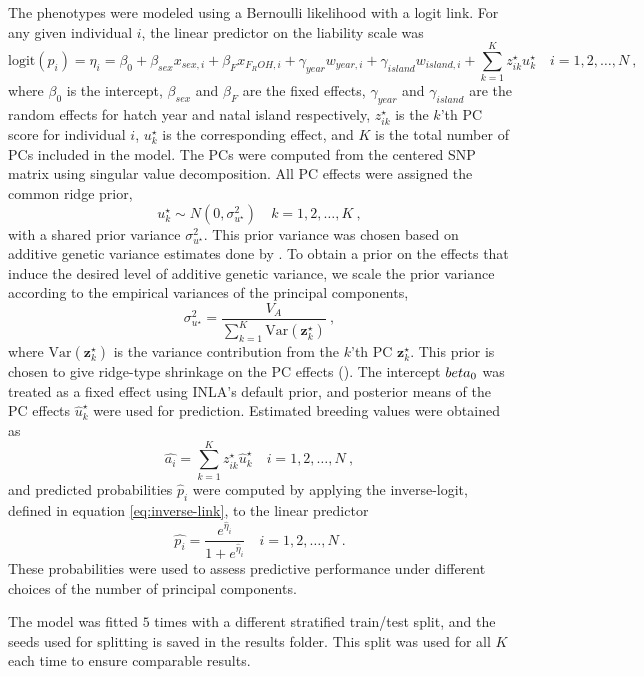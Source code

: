 The phenotypes were modeled using a Bernoulli likelihood with a logit link. For any given individual $i$, the linear predictor on the liability scale was
$$
\mathrm{logit}(p_i) = \eta_i =   \beta_0 + \beta_{sex}x_{sex, i} + \beta_{F} x_{F_ROH, i} + \gamma_{year} w_{year, i} + \gamma_{island} w_{island, i} + \sum_{k=1}^K z_{ik}^\star u_k^\star \quad i = 1, 2, \dots, N \ ,
$$
where $\beta_0$ is the intercept, $\beta_{sex}$ and $\beta_F$ are the fixed effects, $\gamma_{year}$ and $\gamma_{island}$ are the random effects for hatch year and natal island respectively, $z_{ik}^\star$ is the $k$'th PC score for individual $i$, $u_k^\star$ is the corresponding effect, and $K$ is the total number of PCs included in the model. The PCs were computed from the centered SNP matrix using singular value decomposition. All PC effects were assigned the common ridge prior,
$$
u_k^\star \sim N(0, \sigma_{u^\star}^2) \quad k = 1, 2, \dots, K\ ,
$$
with a shared prior variance $\sigma_{u^\star}^2$. This prior variance was chosen based on additive genetic variance estimates done by \textcite{saatoglu_genetic_2024}. 
To obtain a prior on the effects that induce the desired level of additive genetic variance, we scale the prior variance according to the empirical variances of the principal components,
$$
\sigma_{u^\star}^2 = 
\frac{V_A}{\sum_{k=1}^K \mathrm{Var}(\mathbf{z}_k^\star)} \ ,
$$
where $\mathrm{Var}(\mathbf{z}_k^\star)$ is the variance contribution from the $k$'th PC $\mathbf{z}_k^\star$. This prior is chosen to give ridge-type shrinkage on the PC effects (\cite{aspheim_bayesian_2024}).
The intercept $\\beta_0$ was treated as a fixed effect using INLA’s default prior, and posterior means of the PC effects $\hat{u}_k^\star$  were used for prediction. Estimated breeding values were obtained as
%
$$
\hat{a_i} = \sum_{k=1}^K z_{ik}^\star \hat{u}_k^\star \quad i = 1, 2, \dots, N \ ,
$$
%
and predicted probabilities $\hat{p}_i$ were computed by applying the inverse-logit, defined in equation \eqref{eq:inverse-link}, to the linear predictor
%
$$
\hat{p_i} = \frac{e^{\hat{\eta}_i}}{1 + e^{\hat{\eta}_i}} \quad i = 1, 2, \dots, N \ .
$$
These probabilities were used to assess predictive performance under
different choices of the number of principal components.  


The model was fitted $5$ times with a different stratified train/test split, and the seeds used for splitting is saved in the results folder. This split was used for all $K$ each time to ensure comparable results. 

